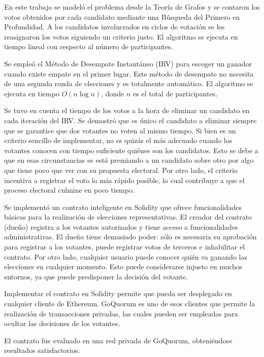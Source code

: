 \begin{conclusions}
    En este trabajo se model\'o el problema desde la Teor\'ia de Grafos y  se contaron los votos obtenidos por cada candidato mediante una B\'usqueda del Primero en Profundidad. A los candidatos involucrados en ciclos de votaci\'on se les reasignaron los votos siguiendo un criterio justo. El algoritmo se ejecuta en tiempo lineal con respecto al n\'umero de participantes.

    Se emple\'o el M\'etodo de Desempate Instant\'aneo (IRV) para escoger un ganador cuando existe empate en el primer lugar. Este m\'etodo de desempate no necesita de una segunda ronda de elecciones y es totalmente autom\'atico. El algoritmo se ejecuta en tiempo $O(n \log n)$, donde $n$ es el total de participantes.
    
    Se tuvo en cuenta el tiempo de los votos a la hora de eliminar un candidato  en cada iteraci\'on del IRV. Se demostr\'o que es \'unico el candidato a eliminar siempre que se garantice que dos votantes no voten al mismo tiempo. Si bien es un criterio sencillo de implementar, no es quiz\'as el m\'as adecuado cuando los votantes conocen con tiempo suficiente qui\'enes son los candidatos. Esto se debe a que en esas circunstancias se est\'a premiando a un candidato sobre otro por algo que tiene poco que ver con su propuesta electoral. Por otro lado, el criterio incentiva a registrar el voto lo m\'as r\'apido posible, lo cual contribuye a que  el proceso electoral culmine en poco tiempo.

    Se implement\'o un contrato inteligente en  Solidity que ofrece funcionalidades b\'asicas para la realizaci\'on de elecciones representativas. El creador del contrato (due\~no) registra a los votantes autorizados y tiene acceso a funcionalidades administrativas. El due\~no tiene demasiado poder: s\'olo es necesaria su aprobaci\'on para registrar a los votantes, puede registrar votos de terceros e inhabilitar el contrato. Por otro lado, cualquier usuario puede conocer qui\'en va ganando las elecciones en cualquier momento. Esto puede considerarse injusto en muchos entornos, ya que puede predisponer la decisi\'on del votante.

    Implementar el contrato en Solidity permite que pueda ser desplegado en cualquier cliente de Ethereum. GoQuorum es uno de esos clientes que permite la realizaci\'on de transacciones privadas, las cuales pueden ser empleadas para ocultar las decisiones de los votantes.
    
    El contrato fue evaluado en una red privada de GoQuorum, obteni\'endose resultados satisfactorios.
\end{conclusions}
